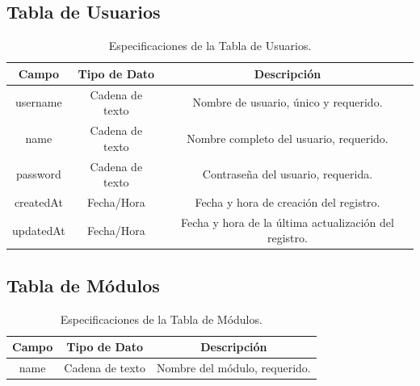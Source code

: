 \subsection{Tabla de Usuarios}
\begin{table}[h!]
    \centering
    \begin{tabular}{|c|c|c|}
    \hline
    \rowcolor[HTML]{FCE8B2} 
    \textbf{Campo} & \textbf{Tipo de Dato} & \textbf{Descripción} \\ \hline
    username & Cadena de texto & Nombre de usuario, único y requerido. \\ \hline
    name & Cadena de texto & Nombre completo del usuario, requerido. \\ \hline
    password & Cadena de texto & Contraseña del usuario, requerida. \\ \hline
    createdAt & Fecha/Hora & Fecha y hora de creación del registro. \\ \hline
    updatedAt & Fecha/Hora & Fecha y hora de la última actualización del registro. \\ \hline
    \end{tabular}
    \caption{Especificaciones de la Tabla de Usuarios.}
\end{table}

\subsection{Tabla de Módulos}
\begin{table}[h!]
    \centering
    \begin{tabular}{|c|c|c|}
    \hline
    \rowcolor[HTML]{FCE8B2} 
    \textbf{Campo} & \textbf{Tipo de Dato} & \textbf{Descripción} \\ \hline
    name & Cadena de texto & Nombre del módulo, requerido. \\ \hline
    \end{tabular}
    \caption{Especificaciones de la Tabla de Módulos.}
\end{table}

